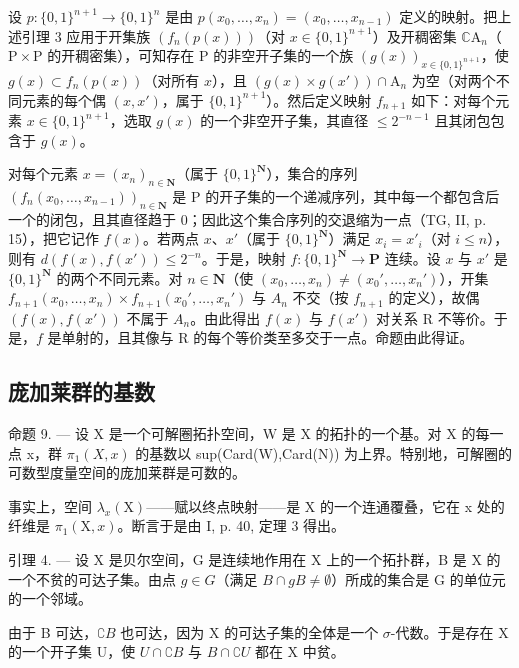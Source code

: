 设 \(p \colon \{0,1\}^{n+1} \to \{0,1\}^n\) 是由 \(p(x_0, \ldots, x_n) = (x_0, \ldots, x_{n-1})\) 定义的映射。把上述引理 3 应用于开集族 \((f_n(p(x)))\)（对 \(x \in \{0,1\}^{n+1}\)）及开稠密集 \(\mathbb{C}\mathrm{A}_n\)（\(\mathrm{P} \times \mathrm{P}\) 的开稠密集），可知存在 P 的非空开子集的一个族 \((g(x))_{x \in \{0,1\}^{n+1}}\)，使 \(g(x) \subset f_n(p(x))\)（对所有 \(x\)），且 \((g(x) \times g(x')) \cap \mathrm{A}_n\) 为空（对两个不同元素的每个偶 \((x,x')\)，属于 \(\{0,1\}^{n+1}\)）。然后定义映射 \(f_{n+1}\) 如下：对每个元素 \(x \in \{0,1\}^{n+1}\)，选取 \(g(x)\) 的一个非空开子集，其直径 \(\leqslant 2^{-n-1}\) 且其闭包包含于 \(g(x)\)。

对每个元素 \(x = (x_n)_{n \in \mathbf{N}}\)（属于 \(\{0,1\}^{\mathbf{N}}\)），集合的序列 \((f_n(x_0, \ldots, x_{n-1}))_{n \in \mathbf{N}}\) 是 P 的开子集的一个递减序列，其中每一个都包含后一个的闭包，且其直径趋于 0；因此这个集合序列的交退缩为一点（TG, II, p. 15），把它记作 \(f(x)\)。若两点 \(x\)、\(x'\)（属于 \(\{0,1\}^{\mathbf{N}}\)）满足 \(x_i = x'_i\)（对 \(i \leqslant n\)），则有 \(d(f(x), f(x')) \leqslant 2^{-n}\)。于是，映射 \(f: \{0,1\}^{\mathbf{N}} \to \mathbf{P}\) 连续。设 \(x\) 与 \(x'\) 是 \(\{0,1\}^{\mathbf{N}}\) 的两个不同元素。对 \(n \in \mathbf{N}\)（使 \((x_0, \ldots, x_n) \neq (x_0', \ldots, x_n')\)），开集 \(f_{n+1}(x_0, \ldots, x_n) \times f_{n+1}(x_0', \ldots, x_n')\) 与 \(A_n\) 不交（按 \(f_{n+1}\) 的定义），故偶 \((f(x), f(x'))\) 不属于 \(A_n\)。由此得出 \(f(x)\) 与 \(f(x')\) 对关系 R 不等价。于是，\(f\) 是单射的，且其像与 R 的每个等价类至多交于一点。命题由此得证。

\subsection{庞加莱群的基数}

命题 9. --- 设 X 是一个可解圈拓扑空间，W 是 X 的拓扑的一个基。对 X 的每一点 x，群 \(\pi_{1}(X,x)\) 的基数以 sup(Card(W),Card(N)) 为上界。特别地，可解圈的可数型度量空间的庞加莱群是可数的。

事实上，空间 \(\lambda_{x}(\mathrm{X})\)——赋以终点映射——是 X 的一个连通覆叠，它在 x 处的纤维是 \(\pi_{1}(\mathrm{X}, x)\)。断言于是由 I, p. 40, 定理 3 得出。

引理 4. --- 设 X 是贝尔空间，G 是连续地作用在 X 上的一个拓扑群，B 是 X 的一个不贫的可达子集。由点 \(g \in G\)（满足 \(B \cap gB \neq \emptyset\)）所成的集合是 G 的单位元的一个邻域。

由于 B 可达，\(\complement B\) 也可达，因为 X 的可达子集的全体是一个 \(\sigma\)-代数。于是存在 X 的一个开子集 U，使 \(U \cap \complement B\) 与 \(B \cap \complement U\) 都在 X 中贫。

